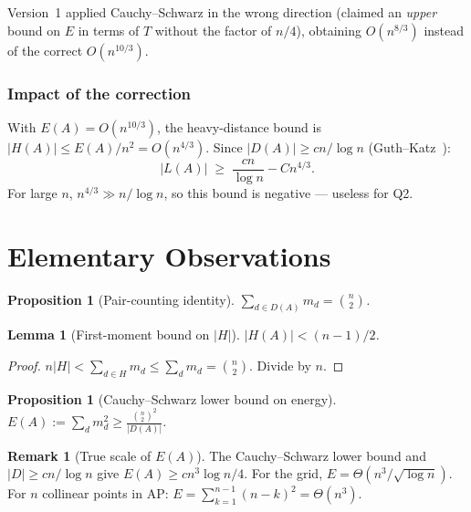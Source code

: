 \documentclass[12pt,a4paper]{amsart}
\def\cL{\textit{L}}\def\cH{\textit{H}}%
\theoremstyle{plain}
\newtheorem{lemma}[theorem]{Lemma}
\newtheorem{proposition}[theorem]{Proposition}
\theoremstyle{definition}
\newtheorem{remark}[theorem]{Remark}
\newcommand{\cL}{\mathcal{L}}
\newcommand{\cH}{\mathcal{H}}
\begin{document}
Version~1 applied Cauchy--Schwarz in the wrong direction (claimed an
\emph{upper} bound on $E$ in terms of $T$ without the factor of $n/4$),
obtaining $O(n^{8/3})$ instead of the correct $O(n^{10/3})$.

\subsubsection{Impact of the correction}

With $E(A)=O(n^{10/3})$, the heavy-distance bound is
$|\cH(A)|\le E(A)/n^2 = O(n^{4/3})$.
Since $|D(A)|\ge cn/\log n$ (Guth--Katz~\cite{GK15}):
\[
  |\cL(A)| \;\ge\; \frac{cn}{\log n} - Cn^{4/3}.
\]
For large $n$, $n^{4/3}\gg n/\log n$, so this bound is negative ---
useless for Q2.

\section{Elementary Observations}
\label{sec:setup}

\begin{proposition}[Pair-counting identity]
\label{prop:identity}
$\displaystyle\sum_{d\in D(A)} m_d = \binom{n}{2}$.
\end{proposition}

\begin{lemma}[First-moment bound on $|\cH|$]
\label{lem:firstmom}
$|\cH(A)| < (n-1)/2$.
\end{lemma}

\begin{proof}
$n|\cH| < \sum_{d\in\cH}m_d\le\sum_d m_d=\binom{n}{2}$.
Divide by $n$.
\end{proof}

\begin{proposition}[Cauchy--Schwarz lower bound on energy]
\label{prop:CSenergy}
$\displaystyle E(A):=\sum_d m_d^2 \ge \frac{\binom{n}{2}^2}{|D(A)|}$.
\end{proposition}

\begin{remark}[True scale of $E(A)$]
The Cauchy--Schwarz lower bound and $|D|\ge cn/\log n$ give
$E(A)\ge cn^3\log n/4$.  For the grid, $E=\Theta(n^3/\sqrt{\log n})$.
For $n$ collinear points in AP: $E=\sum_{k=1}^{n-1}(n-k)^2=\Theta(n^3)$.
\end{remark}

\end{document}
